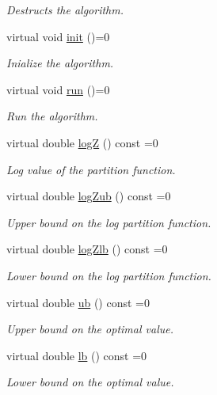\begin{DoxyCompactItemize}
\begin{DoxyCompactList}\small\item\em Destructs the algorithm. \end{DoxyCompactList}\item 
virtual void \hyperlink{classmerlin_1_1algorithm_af43f277863c17eeb153c652f9c3c54cd}{init} ()=0
\begin{DoxyCompactList}\small\item\em Inialize the algorithm. \end{DoxyCompactList}\item 
virtual void \hyperlink{classmerlin_1_1algorithm_a6a701ee51b3d1009041702129161b0de}{run} ()=0
\begin{DoxyCompactList}\small\item\em Run the algorithm. \end{DoxyCompactList}\item 
virtual double \hyperlink{classmerlin_1_1algorithm_a26eadf71ba80c0a9cd3d7cfe18c95717}{logZ} () const =0
\begin{DoxyCompactList}\small\item\em Log value of the partition function. \end{DoxyCompactList}\item 
virtual double \hyperlink{classmerlin_1_1algorithm_aeece2e8f008bcc94697353088c4afefe}{log\+Zub} () const =0
\begin{DoxyCompactList}\small\item\em Upper bound on the log partition function. \end{DoxyCompactList}\item 
virtual double \hyperlink{classmerlin_1_1algorithm_a14d163a3e90a898487d3a6e273e1fecf}{log\+Zlb} () const =0
\begin{DoxyCompactList}\small\item\em Lower bound on the log partition function. \end{DoxyCompactList}\item 
virtual double \hyperlink{classmerlin_1_1algorithm_a2698bb69f5559889d4903a640f08cd66}{ub} () const =0
\begin{DoxyCompactList}\small\item\em Upper bound on the optimal value. \end{DoxyCompactList}\item 
virtual double \hyperlink{classmerlin_1_1algorithm_adc3f19055c0466682b5577049df14863}{lb} () const =0
\begin{DoxyCompactList}\small\item\em Lower bound on the optimal value. \end{DoxyCompactList}\item 

\end{DoxyCompactItemize}
